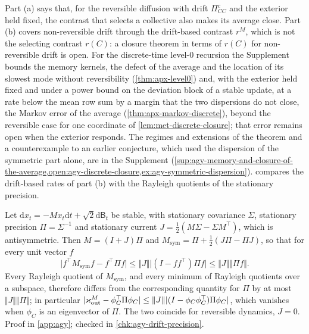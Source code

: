 Part (a) says that, for the reversible diffusion with drift $\Pi^c_{CC}$ and the exterior held fixed, the contrast that selects a collective also makes its average close. Part (b) covers non-reversible drift through the drift-based contrast $r^M$, which is not the selecting contrast $r(C)$: a closure theorem in terms of $r(C)$ for non-reversible drift is open. For the discrete-time level-0 recursion the Supplement bounds the memory kernels, the defect of the average and the location of its slowest mode without reversibility (\cref{thm:apx-level0}) and, with the exterior held fixed and under a power bound on the deviation block of a stable update, at a rate below the mean row sum by a margin that the two dispersions do not close, the Markov error of the average (\cref{thm:apx-markov-discrete}), beyond the reversible case for one coordinate of \cref{lem:met-discrete-closure}; that error remains open when the exterior responds. The regimes and extensions of the theorem and a counterexample to an earlier conjecture, which used the dispersion of the symmetric part alone, are in the Supplement (\cref{sup:agy-memory-and-closure-of-the-average,open:agy-discrete-closure,ex:agy-symmetric-dispersion}).  compares the drift-based rates of part (b) with the Rayleigh quotients of the stationary precision.

\begin{proposition}\label{prop:agy-drift-precision}
Let $\mathrm dx_t=-Mx_t\mathrm dt+\sqrt2\mathrm d\mathsf B_t$ be stable, with stationary covariance $\Sigma$, stationary precision $\Pi=\Sigma^{-1}$ and stationary current $J=\frac12(M\Sigma-\Sigma M^\top)$, which is antisymmetric. Then $M=(I+J)\Pi$ and $M_{\mathrm{sym}}=\Pi+\frac12(J\Pi-\Pi J)$, so that for every unit vector $f$
\begin{equation}\label{eq:agy-drift-precision}
\bigl\lvert f^\top M_{\mathrm{sym}}f-f^\top\Pi f\bigr\rvert\le\Vert J\Vert\bigl\lvert(I-ff^\top)\Pi f\bigr\rvert\le\Vert J\Vert\Vert\Pi f\Vert.
\end{equation}
Every Rayleigh quotient of $M_{\mathrm{sym}}$, and every minimum of Rayleigh quotients over a subspace, therefore differs from the corresponding quantity for $\Pi$ by at most $\Vert J\Vert\Vert\Pi\Vert$; in particular $\lvert\varkappa_{\mathrm{out}}^M-\phi_C^\top\Pi\phi_C\rvert\le\Vert J\Vert\lvert(I-\phi_C\phi_C^\top)\Pi\phi_C\rvert$, which vanishes when $\phi_C$ is an eigenvector of $\Pi$. The two coincide for reversible dynamics, $J=0$. Proof in \cref{app:agy}; checked in \cref{chk:agy-drift-precision}.
\end{proposition}

